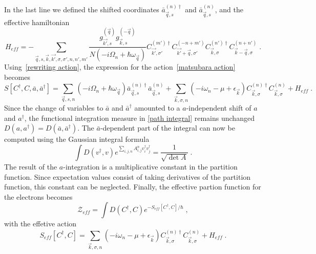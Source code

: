 \documentclass{article}
\begin{document}
In the last line we defined the shifted coordinates  $\bar{a}^{(n)\dagger}_{\vec{q},s}$ and $\bar{a}^{(n)}_{\vec{q},s}$, and the effective hamiltonian
\begin{equation}
    H_{eff} = -\sum_{\vec{q},s,\vec{k},\vec{k'},\sigma,\sigma', n, n', m'} \frac{g_{\vec{k'},s}^{(\vec{q})} g_{\vec{k},s}^{(-\vec{q})}  }{N\left(-i\Omega_n + \hbar \omega_{\vec{q}}\right)}
      C^{(m')\dagger}_{\vec{k'},\sigma'}C^{(-n + m')}_{\vec{k'} + \vec{q},\sigma'} C^{(n')\dagger}_{\vec{k},\sigma}C^{(n + n')}_{\vec{k} - \vec{q},\sigma}\;. 
    \label{effective hamiltonian}
\end{equation}
Using~\cref{rewriting action}, the expression for the action~\cref{matsubara action} becomes
\begin{equation}
     S[C^{\dagger},C,\bar{a},\bar{a}^{\dagger}] = \sum_{\vec{q},s,n} \left(-i\Omega_n + \hbar \omega_{\vec{q}}\right)  \bar{a}^{(n)\dagger}_{\vec{q},s}\bar{a}^{(n)}_{\vec{q},s} + \sum_{\vec{k},\sigma, n} \left(-i\omega_n - \mu + \epsilon_{\vec{k}}\right) C^{(n)\dagger}_{\vec{k},\sigma} C^{(n)}_{\vec{k},\sigma} +  H_{eff} \;.
     \label{action shifted coordinates}
\end{equation}
Since the change of variables to $\bar{a}$ and $\bar{a}^{\dagger}$ amounted to a $a$-independent shift of $a$ and $a^{\dagger}$, the functional integration measure in \cref{path integral} remains unchanged $D(a,a^{\dagger}) = D(\bar{a},\bar{a}^{\dagger})$. 
The $\bar{a}$-dependent part of the integral can now be computed using the Gaussian integral formula~\cite{Altland}
\begin{equation}
    \int D(v^{\dagger},v) e^{\sum_{i,j,n} A_{i,j}^{n} v_i^{\dagger} v_j^{\dagger}} = \frac{1}{\sqrt{\det{A}}} \;.
    \label{gaussian integral}
\end{equation}
The result of the ${a}$-integration is a multiplicative constant in the partition function. Since expectation values consist of taking derivatives of the partition function, this constant can be neglected. Finally, the effective partion function for the electrons becomes
\begin{equation}
    \mathcal{Z}_{eff} = \int D(C^{\dagger}, C) e^{-S_{eff}[C^{\dagger},C] / \hbar}\;,
    \label{effective partion function}
\end{equation} 
with the effetive action
\begin{equation}
    S_{eff}[C^{\dagger},C] = \sum_{\vec{k},\sigma, n} \left(-i\omega_n - \mu + \epsilon_{\vec{k}}\right) C^{(n)\dagger}_{\vec{k},\sigma} C^{(n)}_{\vec{k},\sigma} +  H_{eff} \;.
    \label{effective action}
\end{equation}


\printbibliography
\end{document}
